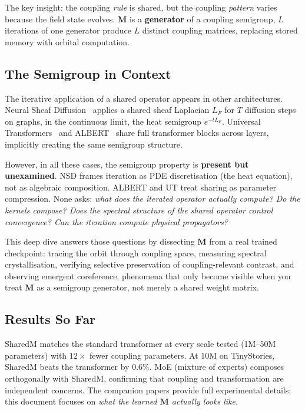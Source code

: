 \documentclass[11pt, a4paper]{article}
\newcommand{\M}{\mathbf{M}}
\theoremstyle{plain}
\theoremstyle{remark}
\begin{document}
The key insight: the coupling \emph{rule} is shared, but the coupling \emph{pattern} varies because the field state evolves.
$\M$ is a \textbf{generator} of a coupling semigroup, $L$ iterations of one generator produce $L$ distinct coupling matrices, replacing stored memory with orbital computation.

\subsection{The Semigroup in Context}

The iterative application of a shared operator appears in other architectures.
Neural Sheaf Diffusion~\cite{bodnar2022sheaf} applies a shared sheaf Laplacian $L_F$ for $T$ diffusion steps on graphs, in the continuous limit, the heat semigroup $e^{-tL_F}$.
Universal Transformers~\cite{dehghani2018universal} and ALBERT~\cite{lan2020albert} share full transformer blocks across layers, implicitly creating the same semigroup structure.

However, in all these cases, the semigroup property is \textbf{present but unexamined}.
NSD frames iteration as PDE discretisation (the heat equation), not as algebraic composition.
ALBERT and UT treat sharing as parameter compression.
None asks: \emph{what does the iterated operator actually compute? Do the kernels compose? Does the spectral structure of the shared operator control convergence? Can the iteration compute physical propagators?}

This deep dive answers those questions by dissecting $\M$ from a real trained checkpoint: tracing the orbit through coupling space, measuring spectral crystallisation, verifying selective preservation of coupling-relevant contrast, and observing emergent coreference, phenomena that only become visible when you treat $\M$ as a semigroup generator, not merely a shared weight matrix.

\subsection{Results So Far}

SharedM matches the standard transformer at every scale tested (1M--50M parameters) with $12\times$ fewer coupling parameters.
At 10M on TinyStories, SharedM beats the transformer by $0.6\%$.
MoE (mixture of experts) composes orthogonally with SharedM, confirming that coupling and transformation are independent concerns.
The companion papers provide full experimental details; this document focuses on \emph{what the learned $\M$ actually looks like}.
\end{document}
